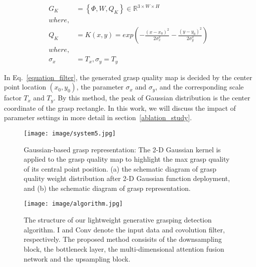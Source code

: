 \documentclass[journal]{IEEEtran}
\begin{document}
\begin{equation}\label{equation_filter}
\begin{aligned}
G_K &= \left\{\Phi,W,Q_K\right\}\in{\mathbb{R}^{3\times W\times H}}\\
where,\\
Q_K &= K(x,y) = exp(-\frac{(x-x_0)^2}{2\sigma_x^2} - \frac{(y-y_0)^2}{2\sigma_y^2})\\
where,\\
\sigma_x &= T_x, \sigma_y = T_y 
\end{aligned}
\end{equation} 



In Eq.~\ref{equation_filter}, the generated grasp quality map is decided by the center point location $(x_0,y_0)$, the parameter $\sigma_x$ and $\sigma_y$, and the corresponding scale factor $T_x$ and $T_y$. By this method, the peak of Gaussian distribution is the center coordinate of the grasp rectangle. In this work, we will discuss the impact of parameter settings in more detail in section~\ref{ablation_study}.


\begin{figure}[t!]
{\texttt{[image: image/system5.jpg]}}
	\caption{Gaussian-based grasp representation: The 2-D Gaussian kernel is applied to the grasp quality map to highlight the max grasp quality of its central point position. (a) the schematic diagram of grasp quality weight distribution after 2-D Gaussian function deployment, and (b) the schematic diagram of grasp representation.}
	\label{fig:Hardware}
\end{figure} 


\begin{figure*}[t!]
	\centering 
	\setlength{\belowcaptionskip}{-10pt}       
	{\texttt{[image: image/algorithm.jpg]}}
	\caption{The structure of our lightweight generative grasping detection algorithm. I and Conv denote the input data and covolution filter, respectively. The proposed method consisits of the downsampling block, the bottleneck layer, the multi-dimensional attention fusion network and the upsampling block.}
	\label{fig:system}
\end{figure*} 
\end{document}
